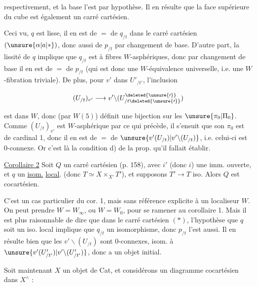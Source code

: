 respectivement, et la base l'est par hypothèse. Il en résulte que la face supérieure du cube est également un carré cartésien.

Ceci vu,   $q$ est lisse, il en est de $=$ de $q_{/t}$ dans le carré cartésien $(\unsure{\alpha|a|*})$, donc aussi de $p_{/t}$ par changement de base. D'autre part, la lissité de $q$ implique que $q_{/t}$ est à fibres $W$-asphériques, donc par changement de base il en est de $=$ de $p_{/t}$ (qui est donc une $W$-équivalence universelle, i.e. une $W$-fibration triviale). De plus,  pour $v'$ dans $U'_{/t'}$, l'inclusion

\[
(U_{/t})_{v'}\longrightarrow v'\backslash(U^{\deleted{\unsure{\prime}}}_{/t\deleted{\unsure{\prime}}})
\]

est dans $W$, donc (par $W(5)$) définit une bijection sur les $\unsure{\pi_0|\Pi_0}$. Comme $(U_{/t})_{v'}$ est $W$-asphérique par ce qui précède, il s'ensuit  que son $\pi_0$ est de cardinal 1, donc il en est de $=$ de $\unsure{v'(U_{/t})|v'\backslash(U_{/t})}$, i.e. celui-ci est $0$-connexe. Or c'est là la condition d) de la prop.  qu'il fallait établir.

\uline{Corollaire 2} Soit $Q$ un carré cartésien (p. 158), avec $i'$ (donc  $i$) une imm. ouverte, et $q$  un \uline{isom.} \uline{local}.   (donc $T\simeq X\times_{X'}T'$), et supposons $T'\longrightarrow T$ iso. Alors $Q$ est cocartésien.

C'est un cas particulier du cor. 1, mais sans référence explicite à un localiseur $W$. On peut prendre $W=W_\infty$, ou $W=W_0$, pour se ramener au corollaire 1. Mais il est plus raisonnable de dire que dans le carré cartésien $(*)$, l'hypothèse que $q$ soit un iso. local implique que $q_{/t}$  un isomorphisme, donc $p_{/t}$ l'est aussi. Il en résulte bien que les $v'\backslash(U_{/t})$ sont $0$-connexes,      isom. à $\unsure{v'(U'_{/t'})|v'\backslash(U'_{/t'})}$, donc a un objet initial.

 Soit maintenant $X$ un objet de Cat, et considérons un diagramme cocartésien dans $X^\wedge$ :


